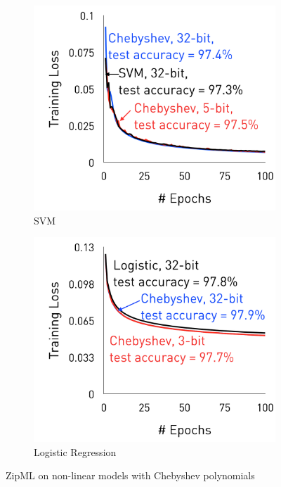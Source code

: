 \documentclass{article}
\begin{document}
\begin{figure}[h]
\centering
    \begin{subfigure}[h]{.4\columnwidth}
    \includegraphics[width=\columnwidth]{final-experiments/SVM-Chebyshev} 
    \caption{SVM}
    \end{subfigure}
    \begin{subfigure}[h]{.4\columnwidth}
    \includegraphics[width=\columnwidth]{final-experiments/Logistic-Chebyshev} 
    \caption{Logistic Regression}
    \end{subfigure}
\caption{ZipML on non-linear models with Chebyshev polynomials}
\label{fig:chebyshev}
\end{figure}
\end{document}

